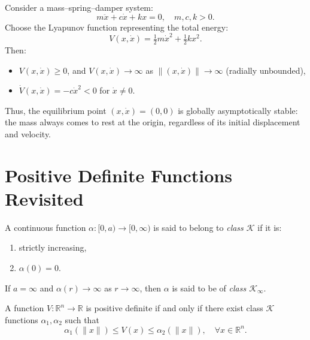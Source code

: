 \begin{example}
	Consider a mass--spring--damper system:
	\begin{equation}
		m\ddot{x} + c\dot{x} + kx = 0, \quad m,c,k>0.
	\end{equation}
	Choose the Lyapunov function representing the total energy:
	\begin{equation}
		V(x,\dot{x}) = \tfrac{1}{2}m\dot{x}^2 + \tfrac{1}{2}kx^2.
	\end{equation}
	Then:
	\begin{itemize}
		\item $V(x,\dot{x}) \ge 0$, and $V(x,\dot{x}) \to \infty$ as $\|(x,\dot{x})\|\to \infty$ (radially unbounded),
		\item $\dot{V}(x,\dot{x}) = -c\dot{x}^2 < 0$ for $\dot{x}\neq 0$.
	\end{itemize}
	Thus, the equilibrium point $(x,\dot{x})=(0,0)$ is globally asymptotically stable:  
	the mass always comes to rest at the origin, regardless of its initial displacement and velocity.
\end{example}


\section{Positive Definite Functions Revisited}

\begin{definition}
	A continuous function $\alpha:[0,a)\to [0,\infty)$ is said to belong to \emph{class $\mathcal{K}$} if it is:
	\begin{enumerate}
		\item strictly increasing,
		\item $\alpha(0)=0$.
	\end{enumerate}
	If $a=\infty$ and $\alpha(r)\to \infty$ as $r\to \infty$, then $\alpha$ is said to be of \emph{class $\mathcal{K}_\infty$}.
\end{definition}

\begin{corollary}
	A function $V:\mathbb{R}^n \to \mathbb{R}$ is positive definite if and only if there exist class $\mathcal{K}$ functions $\alpha_1, \alpha_2$ such that
	\begin{equation}
		\alpha_1(\|x\|) \leq V(x) \leq \alpha_2(\|x\|), \quad \forall x \in \mathbb{R}^n.
	\end{equation}
\end{corollary}

